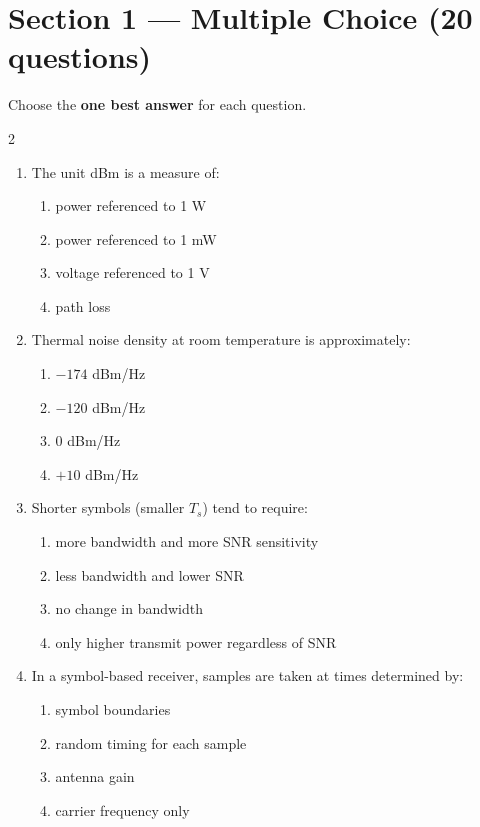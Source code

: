 \section*{Section 1 --- Multiple Choice (20 questions)}
Choose the \textbf{one best answer} for each question.

\vspace{0.3cm}
\begin{multicols}{2}
\begin{enumerate}[leftmargin=*, itemsep=0.4em]
\item The unit dBm is a measure of:
\begin{enumerate}[label=\alph*)]
\item power referenced to 1 W
\item power referenced to 1 mW
\item voltage referenced to 1 V
\item path loss
\end{enumerate}

\item Thermal noise density at room temperature is approximately:
\begin{enumerate}[label=\alph*)]
\item $-174$ dBm/Hz
\item $-120$ dBm/Hz
\item $0$ dBm/Hz
\item $+10$ dBm/Hz
\end{enumerate}

\item Shorter symbols (smaller $T_s$) tend to require:
\begin{enumerate}[label=\alph*)]
\item more bandwidth and more SNR sensitivity
\item less bandwidth and lower SNR
\item no change in bandwidth
\item only higher transmit power regardless of SNR
\end{enumerate}

\item In a symbol-based receiver, samples are taken at times determined by:
\begin{enumerate}[label=\alph*)]
\item symbol boundaries
\item random timing for each sample
\item antenna gain
\item carrier frequency only
\end{enumerate}


\end{enumerate}
\end{multicols}
